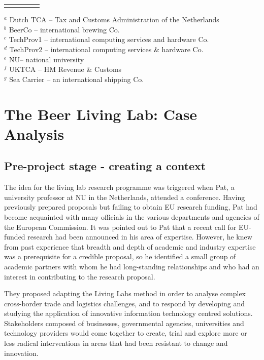 \documentclass[graybox]{styles/svmult}
\begin{document}
\begin{table}[]
\begin{tabular}{p{0.2\linewidth}p{0.8\linewidth}}
\noalign{\smallskip}\svhline\noalign{\smallskip}                                                            
\end{tabular}
$^a$ Dutch TCA -- Tax and Customs Administration of the Netherlands \\
$^b$ BeerCo -- international brewing Co.\\
$^c$ TechProv1 -- international computing services and hardware Co.\\
$^d$ TechProv2 -- international computing services \& hardware Co. \\
$^e$ NU-- national university \\
$^f$ UKTCA -- HM Revenue \& Customs \\
$^g$ Sea Carrier -- an international shipping Co.
\end{table}


\section{The Beer Living Lab: Case Analysis}

\subsection{Pre-project stage - creating a context}
The idea for the living lab research programme was triggered when Pat, a university professor at NU in the Netherlands, attended a conference.
Having previously prepared proposals but failing to obtain EU research funding, Pat had become acquainted with many officials in the various departments and agencies of the European Commission.
It was pointed out to Pat that a recent call for EU-funded research had been announced in his area of expertise. 
However, he knew from past experience that breadth and depth of academic and industry expertise was a prerequisite for a credible proposal, so he identified a small group of academic partners with whom he had long-standing relationships and who had an interest in contributing to the research proposal. 

They proposed adapting the Living Labs method in order to analyse complex cross-border trade and logistics challenges, and to respond by developing and studying the application of innovative information technology centred solutions.
Stakeholders composed of businesses, governmental agencies, universities and technology providers would come together to create, trial and explore more or less radical interventions in areas that had been resistant to change and innovation.
\end{document}
